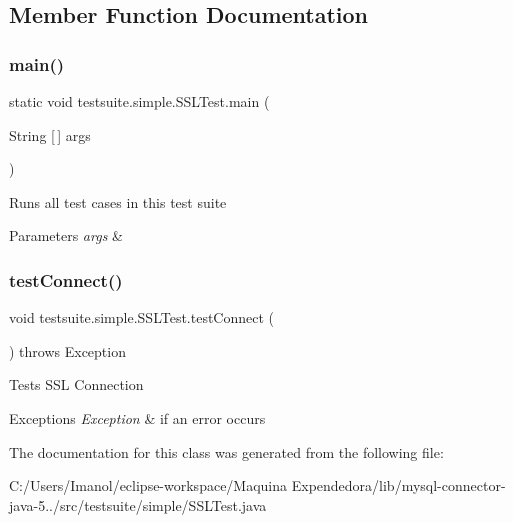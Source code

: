 \subsection{Member Function Documentation}
\mbox{\label{classtestsuite_1_1simple_1_1_s_s_l_test_a0435dcfc4b0a69d7653db1f50647ce9f}} 
\subsubsection{\texorpdfstring{main()}{main()}}
{\footnotesize\ttfamily static void testsuite.\+simple.\+S\+S\+L\+Test.\+main (\begin{DoxyParamCaption}\item[{String \mbox{[}$\,$\mbox{]}}]{args }\end{DoxyParamCaption})\hspace{0.3cm}{\ttfamily [static]}}

Runs all test cases in this test suite


\begin{DoxyParams}{Parameters}
{\em args} & \\
\hline
\end{DoxyParams}
\mbox{\label{classtestsuite_1_1simple_1_1_s_s_l_test_ad9e62b989cd5424f9ca3995f9bea794a}} 
\subsubsection{\texorpdfstring{test\+Connect()}{testConnect()}}
{\footnotesize\ttfamily void testsuite.\+simple.\+S\+S\+L\+Test.\+test\+Connect (\begin{DoxyParamCaption}{ }\end{DoxyParamCaption}) throws Exception}

Tests S\+SL Connection


\begin{DoxyExceptions}{Exceptions}
{\em Exception} & if an error occurs \\
\hline
\end{DoxyExceptions}


The documentation for this class was generated from the following file\+:\begin{DoxyCompactItemize}
\item 
C\+:/\+Users/\+Imanol/eclipse-\/workspace/\+Maquina Expendedora/lib/mysql-\/connector-\/java-\/5../src/testsuite/simple/S\+S\+L\+Test.\+java\end{DoxyCompactItemize}
